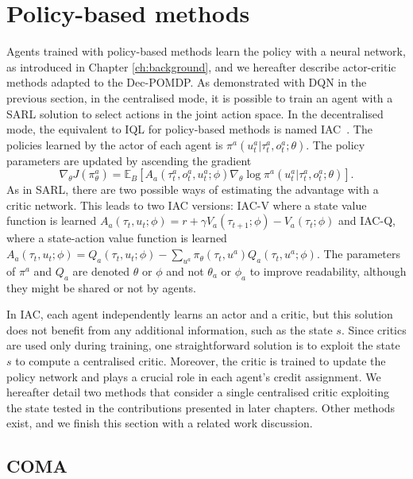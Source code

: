 \section{Policy-based methods}
\label{sec:ch3_policy}

Agents trained with policy-based methods learn the policy with a neural network, as introduced in Chapter \ref{ch:background}, and we hereafter describe actor-critic methods adapted to the Dec-POMDP.
As demonstrated with DQN in the previous section, in the centralised mode, it is possible to train an agent with a SARL solution to select actions in the joint action space.
In the decentralised mode, the equivalent to IQL for policy-based methods is named IAC~\citep{foerster2017coma}.
The policies learned by the actor of each agent is $\pi^{a}(u_t^{a}|\tau_t^{a}, o^a_t;\theta)$.
The policy parameters are updated by ascending the gradient
\begin{equation}
\label{eq:ch3_policy_grad}
    \nabla_\theta J(\pi^a_\theta) = \mathbb{E}_B\left[A_a(\tau^{a}_t, o_t^a, u_t^{a}; \phi) \nabla_{\theta} \log \pi^{a}(u_t^{a}|\tau_t^{a},  o_t^a;\theta)\right].
\end{equation}
As in SARL, there are two possible ways of estimating the advantage with a critic network.
This leads to two IAC versions: IAC-V where a state value function is learned $A_a(\tau_t, u_t; \phi) = r + \gamma V_a(\tau_{t+1}; \phi) - V_a(\tau_t; \phi)$ and IAC-Q, where a state-action value function is learned $A_a(\tau_t, u_t; \phi) = Q_a(\tau_t, u_t; \phi) - \sum_{u^a}\pi_\theta(\tau_t, u^a)Q_a(\tau_t, u^a; \phi)$.
The parameters of $\pi^a$ and $Q_a$ are denoted $\theta$ or $\phi$ and not $\theta_a$ or $\phi_a$ to improve readability, although they might be shared or not by agents.

In IAC, each agent independently learns an actor and a critic, but this solution does not benefit from any additional information, such as the state $s$.
Since critics are used only during training, one straightforward solution is to exploit the state $s$ to compute a centralised critic.
Moreover, the critic is trained to update the policy network and plays a crucial role in each agent's credit assignment.
We hereafter detail two methods that consider a single centralised critic exploiting the state tested in the contributions presented in later chapters.
Other methods exist, and we finish this section with a related work discussion.

\subsection{COMA}
\label{sec:ch3_coma}

